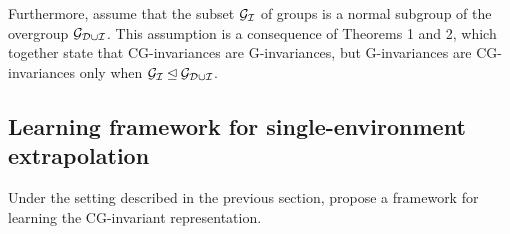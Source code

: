 Furthermore, \citeauthor{Mouli:2021} assume that the subset $\mathcal{G}_{\mathcal{I}}$ of groups is a normal subgroup of the overgroup $\mathcal{G}_{\mathcal{D}\cup\mathcal{I}}$. This assumption is a consequence of Theorems 1 and 2, which together state that CG-invariances are G-invariances, but G-invariances are CG-invariances only when $\mathcal{G}_{\mathcal{I}}\unlhd\mathcal{G}_{\mathcal{D}\cup\mathcal{I}}$. \todo


\subsection{Learning framework for single-environment extrapolation}

\todo Under the setting described in the previous section, \textcite{Mouli:2021} propose a framework for learning the CG-invariant representation.